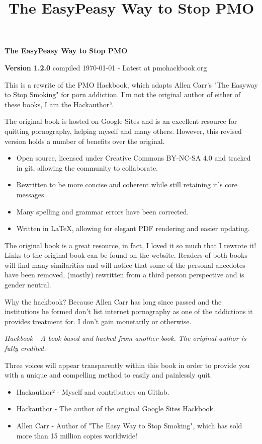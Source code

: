 \documentclass[easypeasy.tex]{subfiles}
\title {The EasyPeasy Way to Stop PMO}
\begin{document}
\thispagestyle{empty}

\begin{center}
  {\Huge\bfseries The EasyPeasy Way to Stop PMO \par}
  {\small \textbf{Version 1.2.0} compiled {\today} - Latest at pmohackbook.org}
\end{center}

This is a rewrite of the PMO Hackbook, which adapts Allen Carr's "The Easyway to Stop Smoking" for porn addiction. I'm not the original author of either of these books, I am the Hackauthor².

The original book is hosted on Google Sites and is an excellent resource for quitting pornography, helping myself and many others. However, this revised version holds a number of benefits over the original.
\begin{itemize}
\item Open source, licensed under Creative Commons BY-NC-SA 4.0 and tracked in git, allowing the community to collaborate.
\item Rewritten to be more concise and coherent while still retaining it's core messages.
\item Many spelling and grammar errors have been corrected.
\item Written in LaTeX, allowing for elegant PDF rendering and easier updating.
\end{itemize}

The original book is a great resource, in fact, I loved it so much that I rewrote it! Links to the original book can be found on the website. Readers of both books will find many similarities and will notice that some of the personal anecdotes have been removed, (mostly) rewritten from a third person perspective and is gender neutral.

Why the hackbook? Because Allen Carr has long since passed and the institutions he formed don't list internet pornography as one of the addictions it provides treatment for. I don't gain monetarily or otherwise.

\textit{{\small Hackbook - A book based and hacked from another book. The original author is fully credited.}}

Three voices will appear transparently within this book in order to provide you with a unique and compelling method to easily and painlessly quit.
\begin{itemize}
  \item Hackauthor² - Myself and contributors on Gitlab.
  \item Hackauthor - The author of the original Google Sites Hackbook.
  \item Allen Carr - Author of "The Easy Way to Stop Smoking", which has sold more than 15 million copies worldwide!
\end{itemize}
\end{document}
